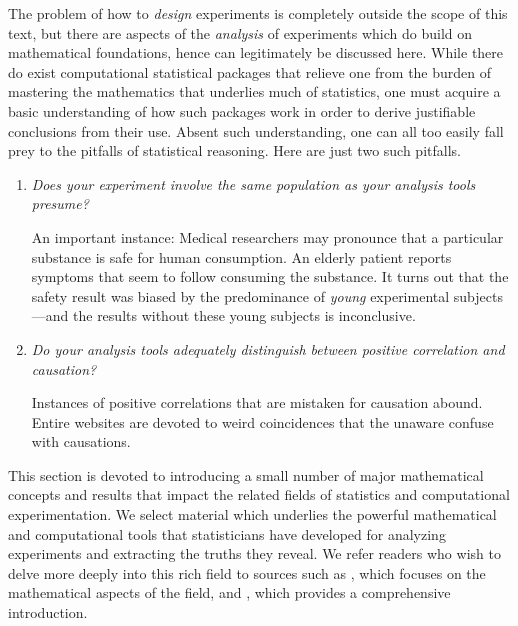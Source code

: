 The problem of how to {\em design} experiments is completely outside the scope of this text, but there are aspects of the {\em analysis} of experiments which do build on mathematical foundations, hence can legitimately be discussed here.  While there do exist computational statistical packages that relieve one from the burden of mastering the mathematics that underlies much of statistics, one must acquire a basic understanding of how such packages work in order to derive justifiable conclusions from their use.  Absent such understanding, one can all too easily fall prey to the pitfalls of statistical reasoning.  Here are just two such pitfalls.
\begin{enumerate}
\item
{\em Does your experiment involve the same population as your analysis tools presume?} 

\smallskip

An important instance: Medical researchers may pronounce that a particular substance is safe for human consumption.  An elderly patient reports symptoms that seem to follow consuming the substance.  It turns out that the safety result was biased by the predominance of {\em young} experimental subjects---and the results without these young subjects is inconclusive.

\medskip\item
{\em Do your analysis tools adequately distinguish between {\em positive correlation} and {\em causation}?}

\smallskip

Instances of positive correlations that are mistaken for causation abound.  Entire websites are devoted to weird coincidences that the unaware confuse with causations.
\end{enumerate}

This section is devoted to introducing a small number of major mathematical concepts and results that impact the related fields of statistics and computational experimentation.  We select material which underlies the powerful mathematical and computational tools that statisticians have developed for analyzing experiments and extracting the truths they reveal.  We refer readers who wish to delve more deeply into this rich field to sources such as \cite{Hoel58}, which focuses on the mathematical aspects of the field, and \cite{Bremaud17}, which provides a comprehensive introduction.

\bigskip

